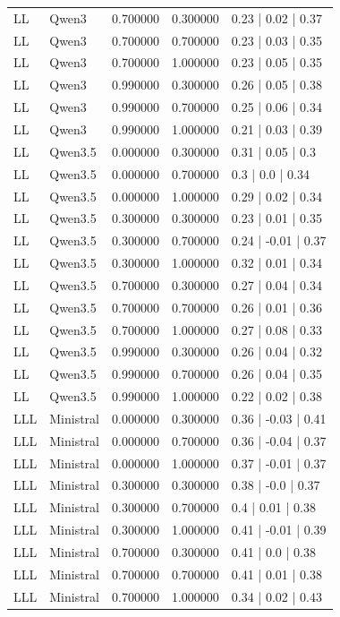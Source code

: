 \begin{longtable}{lllll}
LL & Qwen3 & 0.700000 & 0.300000 & 0.23 | 0.02 | 0.37 \\
LL & Qwen3 & 0.700000 & 0.700000 & 0.23 | 0.03 | 0.35 \\
LL & Qwen3 & 0.700000 & 1.000000 & 0.23 | 0.05 | 0.35 \\
LL & Qwen3 & 0.990000 & 0.300000 & 0.26 | 0.05 | 0.38 \\
LL & Qwen3 & 0.990000 & 0.700000 & 0.25 | 0.06 | 0.34 \\
LL & Qwen3 & 0.990000 & 1.000000 & 0.21 | 0.03 | 0.39 \\
LL & Qwen3.5 & 0.000000 & 0.300000 & 0.31 | 0.05 | 0.3 \\
LL & Qwen3.5 & 0.000000 & 0.700000 & 0.3 | 0.0 | 0.34 \\
LL & Qwen3.5 & 0.000000 & 1.000000 & 0.29 | 0.02 | 0.34 \\
LL & Qwen3.5 & 0.300000 & 0.300000 & 0.23 | 0.01 | 0.35 \\
LL & Qwen3.5 & 0.300000 & 0.700000 & 0.24 | -0.01 | 0.37 \\
LL & Qwen3.5 & 0.300000 & 1.000000 & 0.32 | 0.01 | 0.34 \\
LL & Qwen3.5 & 0.700000 & 0.300000 & 0.27 | 0.04 | 0.34 \\
LL & Qwen3.5 & 0.700000 & 0.700000 & 0.26 | 0.01 | 0.36 \\
LL & Qwen3.5 & 0.700000 & 1.000000 & 0.27 | 0.08 | 0.33 \\
LL & Qwen3.5 & 0.990000 & 0.300000 & 0.26 | 0.04 | 0.32 \\
LL & Qwen3.5 & 0.990000 & 0.700000 & 0.26 | 0.04 | 0.35 \\
LL & Qwen3.5 & 0.990000 & 1.000000 & 0.22 | 0.02 | 0.38 \\
LLL & Ministral & 0.000000 & 0.300000 & 0.36 | -0.03 | 0.41 \\
LLL & Ministral & 0.000000 & 0.700000 & 0.36 | -0.04 | 0.37 \\
LLL & Ministral & 0.000000 & 1.000000 & 0.37 | -0.01 | 0.37 \\
LLL & Ministral & 0.300000 & 0.300000 & 0.38 | -0.0 | 0.37 \\
LLL & Ministral & 0.300000 & 0.700000 & 0.4 | 0.01 | 0.38 \\
LLL & Ministral & 0.300000 & 1.000000 & 0.41 | -0.01 | 0.39 \\
LLL & Ministral & 0.700000 & 0.300000 & 0.41 | 0.0 | 0.38 \\
LLL & Ministral & 0.700000 & 0.700000 & 0.41 | 0.01 | 0.38 \\
LLL & Ministral & 0.700000 & 1.000000 & 0.34 | 0.02 | 0.43 \\

\end{longtable}

